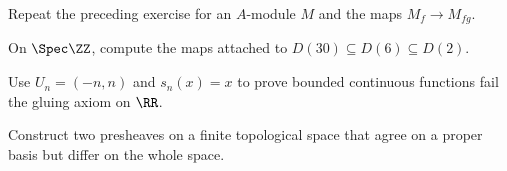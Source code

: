 \begin{exercise}
Repeat the preceding exercise for an $A$-module $M$ and the maps $M_f\to M_{fg}$.
\end{exercise}

\begin{exercise}
On $\Spec\ZZ$, compute the maps attached to $D(30)\subseteq D(6)\subseteq D(2)$.
\end{exercise}

\begin{exercise}
Use $U_n=(-n,n)$ and $s_n(x)=x$ to prove bounded continuous functions fail the gluing axiom on $\RR$.
\end{exercise}

\begin{exercise}
Construct two presheaves on a finite topological space that agree on a proper basis but differ on the whole space.
\end{exercise}
